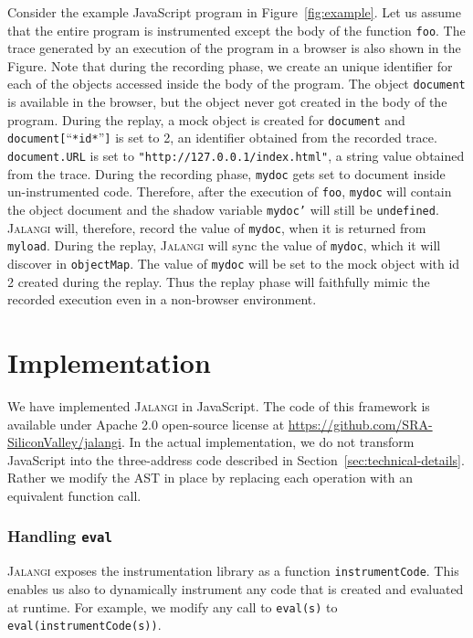 \documentclass{sig-alternate}
\def\jalangi{\textsc{Jalangi}}
\begin{document}
Consider the example JavaScript program in Figure~\ref{fig:example}.
Let us assume that the entire program is instrumented except the body
of the function \texttt{foo}.  The trace generated by an execution of
the program in a browser is also shown in the Figure.  Note that
during the recording phase, we create an unique identifier for each of
the objects accessed inside the body of the program.  The object
\texttt{document} is available in the browser, but the object never
got created in the body of the program.  During the replay, a mock
object is created for \texttt{document} and
\texttt{document[}``\texttt{*id*}''\texttt{]} is set to 2, an identifier obtained from
the recorded trace.  \texttt{document.URL} is set to
\texttt{"http://127.0.0.1/index.html"}, a string value obtained from
the trace.  During the recording phase, \texttt{mydoc} gets set to
document inside un-instrumented code.  Therefore, after the execution
of \texttt{foo}, \texttt{mydoc} will contain the object document and
the shadow variable \texttt{mydoc'} will still be \texttt{undefined}.
\jalangi{} will, therefore, record the value of \texttt{mydoc}, when
it is returned from \texttt{myload}.  During the replay, \jalangi{}
will sync the value of \texttt{mydoc}, which it will discover in
\texttt{objectMap}.  The value of \texttt{mydoc} will be set to the
mock object with id 2 created during the replay.  Thus the replay
phase will faithfully mimic the recorded execution even in a
non-browser environment.

\section{Implementation}
\label{sec:implementation}

We have implemented \jalangi{} in JavaScript.  The code of this
framework is available under Apache 2.0 open-source license at
\url{https://github.com/SRA-SiliconValley/jalangi}.  In the actual
implementation, we do not transform JavaScript into the three-address
code described in Section~\ref{sec:technical-details}.  Rather we
modify the AST in place by replacing each operation with an equivalent
function call.

\subsubsection*{Handling \texttt{eval}}
\label{sec:handling-texttteval}

\jalangi{} exposes the instrumentation
library as a function \texttt{instrumentCode}.  This enables us also
to dynamically instrument any code that is created and evaluated at
runtime.  For example, we modify any call to \texttt{eval(s)} to
\texttt{eval(instrumentCode(s))}.
\end{document}
